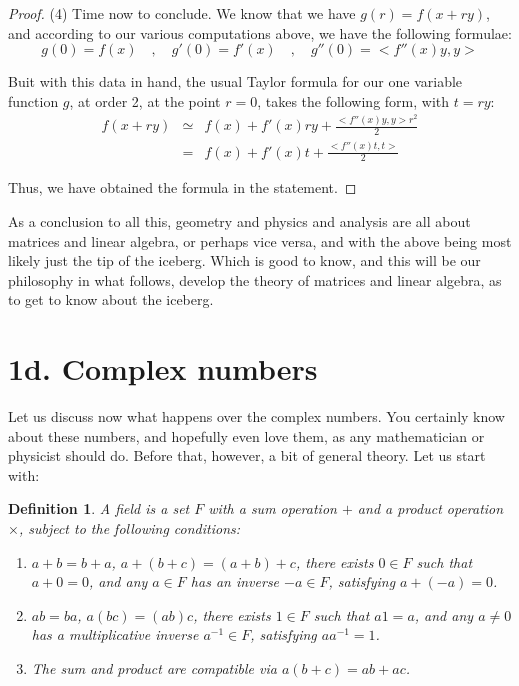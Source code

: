 \documentclass[12pt]{amsbook}
\newtheorem{definition}[theorem]{Definition}
\begin{document}
\begin{proof}
(4) Time now to conclude. We know that we have $g(r)=f(x+ry)$, and according to our various computations above, we have the following formulae:
$$g(0)=f(x)\quad,\quad 
g'(0)=f'(x)\quad,\quad 
g''(0)=<f''(x)y,y>$$

Buit with this data in hand, the usual Taylor formula for our one variable function $g$, at order 2, at the point $r=0$, takes the following form, with $t=ry$:
\begin{eqnarray*}
f(x+ry)
&\simeq&f(x)+f'(x)ry+\frac{<f''(x)y,y>r^2}{2}\\
&=&f(x)+f'(x)t+\frac{<f''(x)t,t>}{2}
\end{eqnarray*}

Thus, we have obtained the formula in the statement.
\end{proof}

As a conclusion to all this, geometry and physics and analysis are all about matrices and linear algebra, or perhaps vice versa, and with the above being most likely just the tip of the iceberg. Which is good to know, and this will be our philosophy in what follows, develop the theory of matrices and linear algebra, as to get to know about the iceberg.

\section*{1d. Complex numbers} 

Let us discuss now what happens over the complex numbers. You certainly know about these numbers, and hopefully even love them, as any mathematician or physicist should do. Before that, however, a bit of general theory. Let us start with:


\begin{definition}
A field is a set $F$ with a sum operation $+$ and a product operation $\times$, subject to the following conditions:
\begin{enumerate}
\item $a+b=b+a$, $a+(b+c)=(a+b)+c$, there exists $0\in F$ such that $a+0=0$, and any $a\in F$ has an inverse $-a\in F$, satisfying $a+(-a)=0$.

\item $ab=ba$, $a(bc)=(ab)c$, there exists $1\in F$ such that $a1=a$, and any $a\neq0$ has a multiplicative inverse $a^{-1}\in F$, satisfying $aa^{-1}=1$.

\item The sum and product are compatible via $a(b+c)=ab+ac$.
\end{enumerate}
\end{definition}
\end{document}
